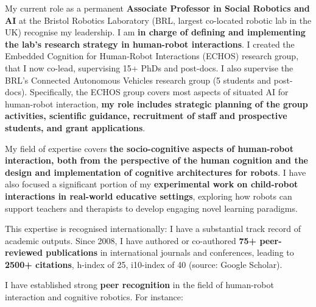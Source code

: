 My current role as a permanent \textbf{Associate Professor in Social Robotics
and AI} at the Bristol Robotics Laboratory (BRL, largest co-located robotic lab
in the UK) recognise my leadership. I am \textbf{in charge of defining and
implementing the lab's research strategy in human-robot interactions}. I created
the Embedded Cognition for Human-Robot Interactions (ECHOS) research group, that
I now co-lead, supervising 15+ PhDs and post-docs. I also supervise the BRL's
Connected Autonomous Vehicles research group (5 students and post-docs).
Specifically, the ECHOS group covers most aspects of situated AI for human-robot
interaction, \textbf{my role includes strategic planning of the group
activities, scientific guidance, recruitment of staff and prospective students,
and grant applications}.

My field of expertise covers \textbf{the socio-cognitive aspects of
human-robot interaction, both from the perspective of the human cognition and
the design and implementation of cognitive architectures for robots}. I have
also focused a significant portion of my \textbf{experimental work on
child-robot interactions in real-world educative settings}, exploring how robots
can support teachers and therapists to develop engaging novel
learning paradigms.

This expertise is recognised internationally: I have a substantial track record
of academic outputs. Since 2008, I have authored or co-authored \textbf{75+ peer-reviewed
publications} in international journals and conferences, leading to \textbf{2500+
citations}, h-index of 25, i10-index of 40 (source: Google Scholar).

I have established strong \textbf{peer recognition} in the field of human-robot interaction
and cognitive robotics. For instance:


